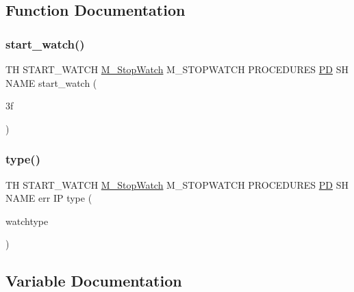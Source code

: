 \subsection{Function Documentation}
\mbox{\label{start__watch_83_8txt_ab7768fefc46b7d8afde391ec2cdf93f8}} 
\subsubsection{\texorpdfstring{start\+\_\+watch()}{start\_watch()}}
{\footnotesize\ttfamily TH S\+T\+A\+R\+T\+\_\+\+W\+A\+T\+CH \hyperlink{option__stopwatch_83_8txt_aa2011fc45a5e502e87ee50996a8a9305}{M\+\_\+\+Stop\+Watch} M\+\_\+\+S\+T\+O\+P\+W\+A\+T\+CH P\+R\+O\+C\+E\+D\+U\+R\+ES \hyperlink{what__overview_81_8txt_a85f26da5a4481fbdb0d9c79f2b94de3e}{PD} SH N\+A\+ME start\+\_\+watch (\begin{DoxyParamCaption}\item[{3f}]{ }\end{DoxyParamCaption})}

\mbox{\label{start__watch_83_8txt_afb126b5ee09c3784b94acaa05b3b2d5f}} 
\subsubsection{\texorpdfstring{type()}{type()}}
{\footnotesize\ttfamily TH S\+T\+A\+R\+T\+\_\+\+W\+A\+T\+CH \hyperlink{option__stopwatch_83_8txt_aa2011fc45a5e502e87ee50996a8a9305}{M\+\_\+\+Stop\+Watch} M\+\_\+\+S\+T\+O\+P\+W\+A\+T\+CH P\+R\+O\+C\+E\+D\+U\+R\+ES \hyperlink{what__overview_81_8txt_a85f26da5a4481fbdb0d9c79f2b94de3e}{PD} SH N\+A\+ME err IP type (\begin{DoxyParamCaption}\item[{watchtype}]{ }\end{DoxyParamCaption})}



\subsection{Variable Documentation}
\mbox{\label{start__watch_83_8txt_aeadc6e1a3f40066d313c6190ab99a7fe}} 
